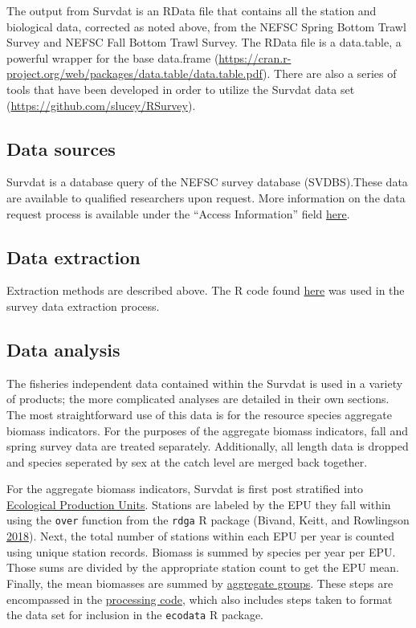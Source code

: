 \documentclass[
]{book}
\begin{document}
The output from Survdat is an RData file that contains all the station and biological data, corrected
as noted above, from the NEFSC Spring Bottom Trawl Survey and NEFSC Fall Bottom Trawl Survey. The RData
file is a data.table, a powerful wrapper for the base data.frame (\url{https://cran.r-project.org/web/packages/data.table/data.table.pdf}).
There are also a series of tools that have been developed in order to utilize the Survdat data set
(\url{https://github.com/slucey/RSurvey}).

\hypertarget{data-sources-40}{%
\subsection{Data sources}\label{data-sources-40}}

Survdat is a database query of the NEFSC survey database (SVDBS).These data are available to qualified researchers upon request. More information on the data request process is available under the ``Access Information'' field \href{https://inport.nmfs.noaa.gov/inport/item/22560}{here}.

\hypertarget{data-extraction-32}{%
\subsection{Data extraction}\label{data-extraction-32}}

Extraction methods are described above. The R code found \href{https://github.com/slucey/RSurvey/blob/master/Survdat.r}{here} was used in the survey data extraction process.

\hypertarget{data-analysis-38}{%
\subsection{Data analysis}\label{data-analysis-38}}

The fisheries independent data contained within the Survdat is used in a variety of
products; the more complicated analyses are detailed in their own sections. The most straightforward use of this data is for the resource species aggregate biomass
indicators. For the purposes of the aggregate biomass indicators, fall and spring
survey data are treated separately. Additionally, all length data is dropped and
species seperated by sex at the catch level are merged back together.

For the aggregate biomass indicators, Survdat is first post stratified into \protect\hyperlink{epu}{Ecological Production Units}. Stations are labeled by the EPU they fall within
using the \texttt{over} function from the \texttt{rdga} R package (Bivand, Keitt, and Rowlingson \protect\hyperlink{ref-rgdal}{2018}). Next, the total number
of stations within each EPU per year is counted using unique station records. Biomass
is summed by species per year per EPU. Those sums are divided by the appropriate
station count to get the EPU mean. Finally, the mean biomasses are summed by \protect\hyperlink{aggroups}{aggregate groups}. These steps are encompassed in the \href{https://github.com/NOAA-EDAB/ecodata/blob/master/data-raw/get_agg_bio.R}{processing code}, which also includes steps taken to format the data set for inclusion in the \texttt{ecodata} R package.
\end{document}
